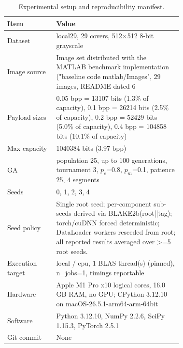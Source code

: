 \begin{table}[!t]
\centering
\caption{Experimental setup and reproducibility manifest.}
\label{tab:repro}
\footnotesize
\begin{tabular}{lp{0.72\linewidth}}
\toprule
Item & Value \\
\midrule
Dataset & local29, 29 covers, 512$\times$512 8-bit grayscale \\
Image source & Image set distributed with the MATLAB benchmark implementation ("baseline code matlab/Images", 29 images, README dated 6 \\
Payload sizes & 0.05 bpp = 13107 bits (1.3\% of capacity), 0.1 bpp = 26214 bits (2.5\% of capacity), 0.2 bpp = 52429 bits (5.0\% of capacity), 0.4 bpp = 104858 bits (10.1\% of capacity) \\
Max capacity & 1040384 bits (3.97 bpp) \\
GA & population 25, up to 100 generations, tournament 3, $p_c$=0.8, $p_m$=0.1, patience 25, 4 segments \\
Seeds & 0, 1, 2, 3, 4 \\
Seed policy & Single root seed; per-component sub-seeds derived via BLAKE2b(root||tag); torch/cuDNN forced deterministic; DataLoader workers reseeded from root; all reported results averaged over >=5 root seeds. \\
Execution target & local / cpu, 1 BLAS thread(s) (pinned), n\_jobs=1, timings reportable \\
Hardware & Apple M1 Pro x10 logical cores, 16.0 GB RAM, no GPU; CPython 3.12.10 on macOS-26.5.1-arm64-arm-64bit \\
Software & Python 3.12.10, NumPy 2.2.6, SciPy 1.15.3, PyTorch 2.5.1 \\
Git commit & None \\
\bottomrule
\end{tabular}
\end{table}
